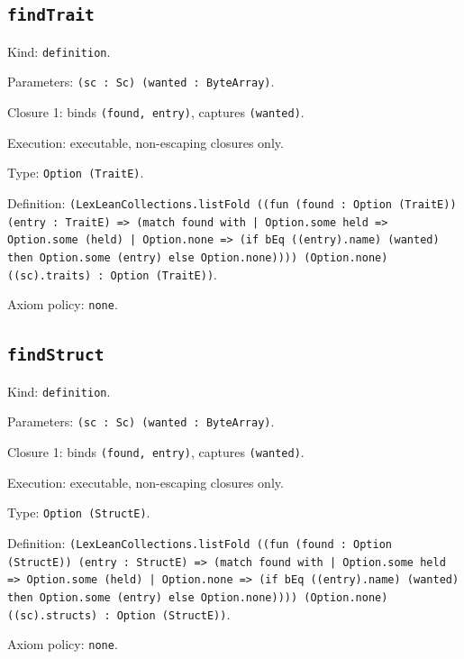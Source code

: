 \documentclass[11pt]{article}
\begin{document}
\subsection*{\texttt{findTrait}}
\noindent Kind: \texttt{definition}.\par
\noindent Parameters: \texttt{(sc : Sc) (wanted : ByteArray)}.\par
\noindent Closure 1: binds \texttt{(found, entry)}, captures \texttt{(wanted)}.\par
\noindent Execution: executable, non-escaping closures only.\par
\noindent Type: \texttt{Option (TraitE)}.\par
\noindent Definition: \texttt{(LexLeanCollections.listFold ((fun (found : Option (TraitE)) (entry : TraitE) => (match found with | Option.some held => Option.some (held) | Option.none => (if bEq ((entry).name) (wanted) then Option.some (entry) else Option.none)))) (Option.none) ((sc).traits) : Option (TraitE))}.\par
\noindent Axiom policy: \texttt{none}.\par
\subsection*{\texttt{findStruct}}
\noindent Kind: \texttt{definition}.\par
\noindent Parameters: \texttt{(sc : Sc) (wanted : ByteArray)}.\par
\noindent Closure 1: binds \texttt{(found, entry)}, captures \texttt{(wanted)}.\par
\noindent Execution: executable, non-escaping closures only.\par
\noindent Type: \texttt{Option (StructE)}.\par
\noindent Definition: \texttt{(LexLeanCollections.listFold ((fun (found : Option (StructE)) (entry : StructE) => (match found with | Option.some held => Option.some (held) | Option.none => (if bEq ((entry).name) (wanted) then Option.some (entry) else Option.none)))) (Option.none) ((sc).structs) : Option (StructE))}.\par
\noindent Axiom policy: \texttt{none}.\par
\end{document}
